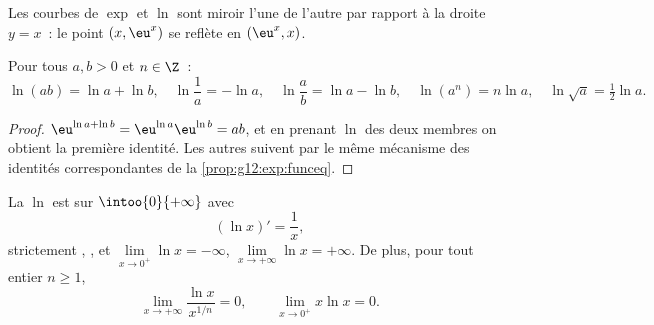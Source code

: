 \begin{omfigure}

{\small Les courbes de $\exp$ et $\ln$ sont  miroir l'une de l'autre
par rapport à la droite $y = x$~: le point $(x, \eu^x)$ se reflète en
$(\eu^x, x)$.}
\end{omfigure}

\begin{proposition}\label{prop:g12:exp:lnalg}
Pour tous $a, b > 0$ et $n \in \Z$~:
\[
\ln(ab) = \ln a + \ln b, \quad
\ln\frac{1}{a} = -\ln a, \quad
\ln\frac{a}{b} = \ln a - \ln b, \quad
\ln(a^n) = n \ln a, \quad
\ln\sqrt{a} = \tfrac12 \ln a .
\]
\end{proposition}

\begin{proof}
$\eu^{\ln a + \ln b} = \eu^{\ln a}\eu^{\ln b} = ab$, et en prenant $\ln$
des deux membres on obtient la première identité. Les autres suivent par
le même mécanisme des identités correspondantes de la
\cref{prop:g12:exp:funceq}.
\end{proof}

\begin{proposition}\label{prop:g12:exp:lnanalytic}
La  $\ln$ est  sur $\intoo{0}{+\infty}$ avec
\[
(\ln x)' = \frac{1}{x},
\]
strictement , , et
$\lim\limits_{x\to0^+} \ln x = -\infty$,
$\lim\limits_{x\to+\infty} \ln x = +\infty$. De plus, pour tout entier
$n \geq 1$,
\[
\lim_{x\to+\infty} \frac{\ln x}{x^{1/n}} = 0, \qquad
\lim_{x\to0^+} x \ln x = 0 .
\]
\end{proposition}

